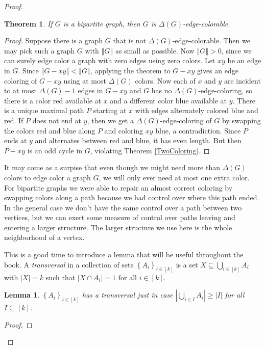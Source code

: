 \documentclass{amsbook}
\theoremstyle{plain}
\newtheorem{lemma}{Lemma}
\newtheorem{theorem}{Theorem}
\numberwithin{equation}{chapter}
\newcommand{\set}[1]{\left\{ #1 \right\}}
\newcommand{\card}[1]{\left|#1\right|}
\newcommand{\size}[1]{\left\Vert#1\right\Vert}
\newcommand{\irange}[1]{\left[#1\right]}
\begin{document}
\begin{proof}
\begin{theorem}\label{DeltaEdgeColoring}
If $G$ is a bipartite graph, then $G$ is $\Delta(G)$-edge-colorable.
\end{theorem}
\begin{proof}
Suppose there is a graph $G$ that is not $\Delta(G)$-edge-colorable.  Then we may pick such a graph $G$ with $\size{G}$ as small as possible.
Now $\size{G} > 0$, since we can surely edge color a graph with zero edges using zero colors.  Let $xy$ be an edge in $G$.  Since $\size{G-xy} < \size{G}$,
applying the theorem to $G-xy$ gives an edge coloring of $G-xy$ using at most $\Delta(G)$ colors.  Now each of $x$ and $y$ are incident to at most $\Delta(G) - 1$ edges
in $G-xy$ and $G$ has no $\Delta(G)$-edge-coloring, so there is a color red available at $x$ and a different color blue available at $y$.  There is a unique maximal 
path $P$ starting at $x$ with edges alternately colored blue and red. If $P$ does not end at $y$, then we get a $\Delta(G)$-edge-coloring of $G$ by swapping the colors red and blue 
along $P$ and coloring $xy$ blue, a contradiction.  Since $P$ ends at $y$ and alternates between red and blue, it has even length.  But then $P + xy$ is an odd cycle in $G$, violating
Theorem \ref{TwoColoring}.
\end{proof}

It may come as a surpise that even though we might need more than $\Delta(G)$ colors to edge color a graph $G$, we will only ever need at most one extra color.
For bipartite graphs we were able to repair an almost correct coloring by swapping colors along a path because we had control over where this path ended.  In the
general case we don't have the same control over a path between two vertices, but we can exert some measure of control over paths leaving and entering a larger structure. 
The larger structure we use here is the whole neighborhood of a vertex.

This is a good time to introduce a lemma that will be useful throughout the book.  
A \emph{transversal} in a collection of sets $\set{A_i}_{i \in \irange{k}}$ is a set $X \subseteq \bigcup_{i \in \irange{k}} A_i$ with $\card{X} = k$ such that $\card{X \cap A_i} = 1$
for all $i \in \irange{k}$.
\begin{lemma}
$\set{A_i}_{i \in \irange{k}}$ has a transversal just in case $\card{\bigcup_{i \in I} A_i} \ge \card{I}$ for all $I \subseteq \irange{k}$.
\end{lemma}
\begin{proof}
\end{proof}


\end{proof}
\end{document}
